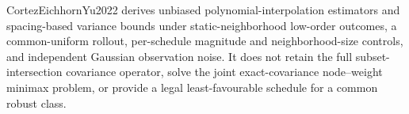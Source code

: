 CortezEichhornYu2022 derives unbiased polynomial-interpolation estimators and spacing-based variance bounds under static-neighborhood low-order outcomes, a common-uniform rollout, per-schedule magnitude and neighborhood-size controls, and independent Gaussian observation noise.  It does not retain the full subset-intersection covariance operator, solve the joint exact-covariance node--weight minimax problem, or provide a legal least-favourable schedule for a common robust class.